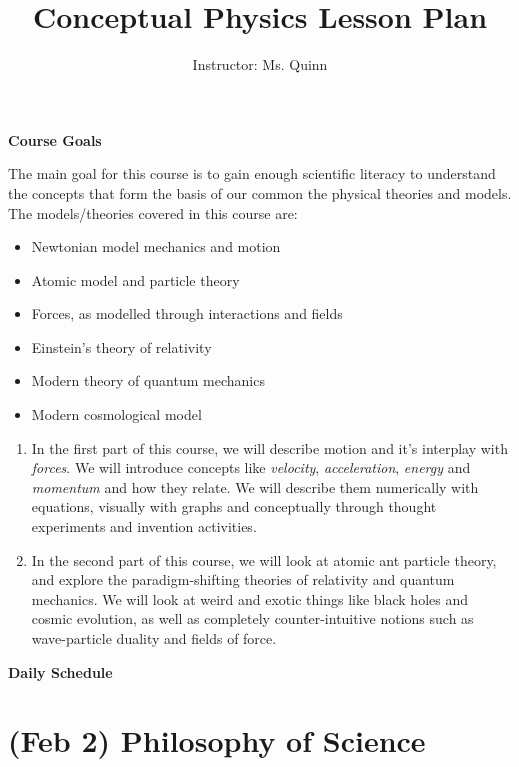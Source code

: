 \documentclass[12pt]{article}
\begin{document}
\title{Conceptual Physics Lesson Plan}

\author{Instructor: Ms. Quinn} 
	
\maketitle

\noindent \textbf{\large Course Goals}

The main goal for this course is to gain enough scientific literacy to understand the concepts that form the basis of our common the physical theories and models. The models/theories covered in this course are:

\begin{itemize}
	\item Newtonian model mechanics and motion
	\item Atomic model and particle theory
	\item Forces, as modelled through interactions and fields
	\item Einstein's theory of relativity
	\item Modern theory of quantum mechanics
	\item Modern cosmological model
\end{itemize}

\begin{enumerate}
\item In the first part of this course, we will describe motion and it's interplay with \textit{forces}. We will introduce concepts like \textit{velocity}, \textit{acceleration}, \textit{energy} and \textit{momentum} and how they relate. We will describe them numerically with equations, visually with graphs and conceptually through thought experiments and invention activities.
\item In the second part of this course, we will look at atomic ant particle theory, and explore the paradigm-shifting theories of relativity and quantum mechanics. We will look at weird and exotic things like black holes and cosmic evolution, as well as completely counter-intuitive notions such as wave-particle duality and fields of force.
\end{enumerate}

\clearpage
\noindent \textbf{\Large Daily Schedule}

\section{(Feb 2) \textbf{Philosophy of Science}}
	
\end{document}
